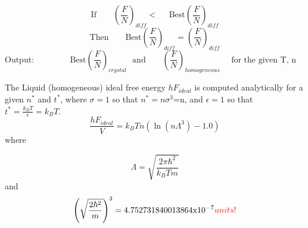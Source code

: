 \documentclass[double,12pt]{beavtex}
\begin{document}
\begin{displaymath}\text{If~~~~~~}\left(\frac{F}{N}\right)_{diff}<\text{~~~~Best}\left(\frac{F}{N}\right)_{diff}\end{displaymath}
\begin{displaymath}\text{Then~~~~~~}\text{Best}\left(\frac{F}{N}\right)_{diff}=\left(\frac{F}{N}\right)_{diff}\end{displaymath}
\begin{displaymath}\text{Output:~~~~~~~~~~~~ Best}\left(\frac{F}{N}\right)_{crystal}\text{~~and~~~~~~}\left(\frac{F}{N}\right)_{homogeneous}\text{~~~~for the given T, n ~~~~~~~~~~~~~~~~~~~~~~~~~}\end{displaymath} 
\[\]

The Liquid (homogeneous) ideal free energy $hF_{ideal}$ is computed analytically for a given $n^*$ and $t^*$, where $\sigma=1$ so that $n^*=n\sigma^3$=n, and $\epsilon=1$ so that $t^*=\frac{k_BT}{\epsilon}=k_BT$. 
\begin{displaymath}{\frac{hF_{ideal}}{V}=k_BTn(\ln(n\Lambda^3)-1.0)}\end{displaymath} where 

\begin{displaymath}{\Lambda =\sqrt{\frac{2\pi\hbar^2}{k_BTm}}}\end{displaymath}  and
\begin{displaymath}\left(\sqrt{\frac{2\hbar^2}{m}}\right)^3=4.752731840013864\text{x}10^{-7}\color{red}units!\color{black}\end{displaymath} 
\end{document}
